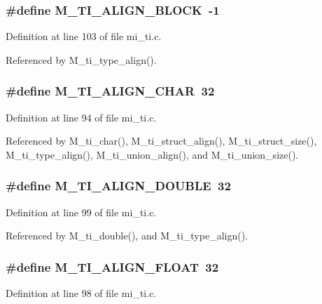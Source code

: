 \subsubsection{\setlength{\rightskip}{0pt plus 5cm}\#define M\_\-TI\_\-ALIGN\_\-BLOCK~-1}\label{mi__ti_8c_ba45bb7f1c3d2687b756807413909855}




Definition at line 103 of file mi\_\-ti.c.

Referenced by M\_\-ti\_\-type\_\-align().
\subsubsection{\setlength{\rightskip}{0pt plus 5cm}\#define M\_\-TI\_\-ALIGN\_\-CHAR~32}\label{mi__ti_8c_94da9a03f750eeb505dae6cd5c57aac3}




Definition at line 94 of file mi\_\-ti.c.

Referenced by M\_\-ti\_\-char(), M\_\-ti\_\-struct\_\-align(), M\_\-ti\_\-struct\_\-size(), M\_\-ti\_\-type\_\-align(), M\_\-ti\_\-union\_\-align(), and M\_\-ti\_\-union\_\-size().
\subsubsection{\setlength{\rightskip}{0pt plus 5cm}\#define M\_\-TI\_\-ALIGN\_\-DOUBLE~32}\label{mi__ti_8c_4bcaa2955b17fb30aef2c953074fb0d0}




Definition at line 99 of file mi\_\-ti.c.

Referenced by M\_\-ti\_\-double(), and M\_\-ti\_\-type\_\-align().
\subsubsection{\setlength{\rightskip}{0pt plus 5cm}\#define M\_\-TI\_\-ALIGN\_\-FLOAT~32}\label{mi__ti_8c_f21ab0f10d67453a4e8c09b66358f1a9}




Definition at line 98 of file mi\_\-ti.c.

